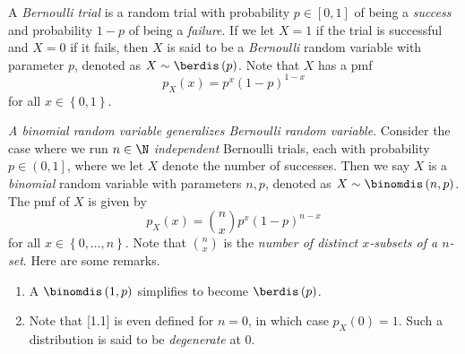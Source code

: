 \documentclass[stat333]{subfiles}
\begin{document}
    \np[Bernoulli]A \emph{Bernoulli trial} is a random trial with probability $p\in\left[ 0,1 \right]$ of being a \textit{success} and probability $1-p$ of being a \textit{failure}. If we let $X=1$ if the trial is successful and $X=0$ if it fails, then $X$ is said to be a \emph{Bernoulli} random variable with parameter $p$, denoted as $X\sim\berdis\left( p \right)$. Note that $X$ has a pmf
    \begin{equation*}
        p_X\left( x \right) = p^x\left( 1-p \right) ^{1-x}
    \end{equation*}
    for all $x\in\left\lbrace 0,1 \right\rbrace$.

    \np[Binomial]\textit{A binomial random variable generalizes Bernoulli random variable}. Consider the case where we run $n\in\N$ \textit{independent} Bernoulli trials, each with probability $p\in\left( 0,1 \right]$, where we let $X$ denote the number of successes. Then we say $X$ is a \emph{binomial} random variable with parameters $n,p$, denoted as $X\sim\binomdis\left( n,p \right)$. The pmf of $X$ is given by
    \begin{equation}
        p_X\left( x \right) = \binom{n}{x}p^x\left( 1-p \right) ^{n-x}
    \end{equation}
    for all $x\in\left\lbrace 0,\ldots,n \right\rbrace$. Note that $\binom{n}{x}$ is the \textit{number of distinct $x$-subsets of a $n$-set}. Here are some remarks.
    \begin{enumerate}
        \item A $\binomdis\left( 1,p \right)$ simplifies to become $\berdis\left( p \right)$.
        \item Note that [1.1] is even defined for $n=0$, in which case $p_X\left( 0 \right) = 1$. Such a distribution is said to be \textit{degenerate} at $0$.
    \end{enumerate}
\end{document}
